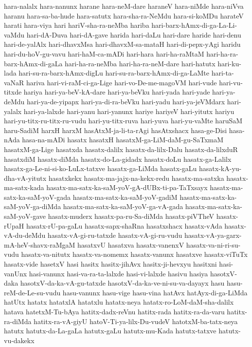{hara-nalalx
hara-nanunx
harane
hara-neM-dare
haraneV
hara-niMde
hara-niVva
haranu
hara-sa-ba-hude
hara-satutx
hara-sha-ra-NeMdu
hara-si-koMDu
harateV
harati
hara-viya
hari
hariV-sha-ra-neMba
hariba
hari-barx-hAmx-di-ga-La-Li-vaMdu
hari-dA-Duva
hari-dA-gave
harida
hari-daLu
hari-dare
haride
hari-denu
hari-de-yalAlx
hari-dhavxMsa
hari-dhavxM-sa-mataH
hari-di-pepx-yAgi
haridu
hari-du-hoV-gu-vavu
hari-haM-ca-mADi
hari-hara
hari-ha-raMtaM
hari-ha-ra-barx-hAmx-di-gaLa
hari-ha-ra-neMba
hari-ha-ra-neM-dare
hari-hatutx
hari-ku-lada
hari-su-ra-barx-hAmx-digLu
hari-su-ra-barx-hAmx-di-ga-LaMte
hari-ta-vaNaR
hariva
hari-vi-raM-ci-ga-Lige
hari-vo-De-me-magoVM
hari-vude
hari-vu-titxde
hariya
hari-ya-beV-kA-dare
hari-ya-beVku
hari-yada
hari-yade
hari-ya-deMdu
hari-ya-de-yipapx
hari-ya-di-ra-beVku
hari-yadu
hari-ya-jeVMdarx
hari-yalalx
hari-ya-lalxde
hari-yanu
hari-yanunx
hariye
hariyeV
hari-yitutx
hariyu
hari-yu-titx-ru-titx-ru-vudu
hari-yu-titx-ruva
hari-yuva
hari-yu-vaMte
haruSaM
haru-SadiM
harxH
harxM
hasAtxM-ja-li-ta-rAgi
hasAtxshacx
hasa-ge-Disi
hasa-nAda
hasa-na-mADi
hasatx
hasatxH
hasatxM-ga-LiM-daM-gu-SaTxmaM
hasatxM-ga-Lige
hasatxda
hasatx-dalilx
hasatx-da-lilx-Dalu
hasatx-da-lilxduR
hasatxdiM
hasatx-diMda
hasatx-do-La-gidadx
hasatx-doLu
hasatx-ga-Lalilx
hasatx-ga-Le-ni-si-ko-LuLx-tatxve
hasatx-ga-LiMda
hasatx-gaLu
hasatx-kA-yu-dha-vA-yitutx
hasatxkekx
hasatx-ma-jajx-na-kekx-redu
hasatx-ma-satxka
hasatx-ma-satx-kada
hasatx-ma-satx-ka-saM-yoV-gA-dUBx-ti-pa-TaTxsayx
hasatx-ma-satx-ka-saM-yoV-gada
hasatx-ma-satx-ka-saM-yoV-gadiM
hasatx-ma-satx-ka-saM-yoV-ga-diMda
hasatx-ma-satx-ka-saM-yoV-ga-vA-gada
hasatx-ma-satx-ka-saM-yoV-gave
hasatx-muderx
hasatx-pa-ru-Sa-diMda
hasatx-piVTheV
hasatx-rUpaH
hasatx-rU-pa-gaLu
hasatx-sapx-shaRna
hasatxshacx
hasatx-vAda
hasatx-vA-du-deMdu
hasatx-vA-gi-ru-tatxde
hasatx-vA-gi-ru-vudu
hasatx-vA-ya-garx-mA-heV-shavx-raMgaM
hasatxvU
hasatxva
hasatx-vanenxV
hasatx-va-ni-ri-su-vudu
hasatx-va-nitutx
hasatx-va-nomemx
hasatx-vanunx
hasatxve
hasatx-viTuTx
hasatx-vide
hasetxV
hasi
hasitx
hasitx-jihAvx
hasitx-ji-hevxyu
hasitxni
hasi-vanUnx
hasi-vanunx
hasi-va-ra-ta-lalxde
hasi-vi-lalxde
hasivu
hasiya
hasotxV-daka
hasotxV-da-ka-vA-gu-tatxde
hasotxV-da-ka-ve-ni-su-va-dayayx
hasu
hasu-reM-de-Le-su-vudu
hasu-vanunx
hasu-vige
hasu-vina
hatAvx
hatAyx-di-ga-LiMda
hatUtx
hatatx
hatatxlA
hatatxlu
hatatx-neya
hatatx-ro-LoM-daM-sha-dalilx
hatava
hatetxM-Tu-bAya
hatitx-dadx-reVnu
hatitx-rada
hatitx-ra-da-varu
hatitx-ra-diMda
hatitx-ra-vA-giyU
hatoV-Ti-ya-lilx-Du-vudeV
hatotxM-ba-tatx-neya
hatutx
hatutx-da-La-gaLa
hatutx-gaLu
hatutx-mu-Kada
hatutx-tatxve
hatutx-vu-dakekx
}
